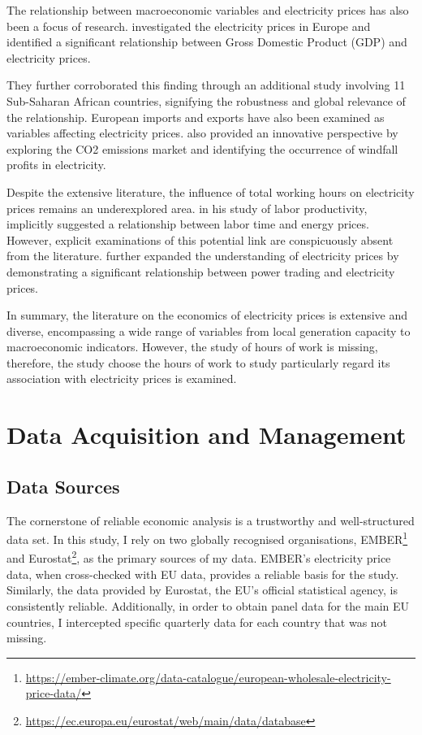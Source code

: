 \documentclass[12pt]{article}
\begin{document}
The relationship between macroeconomic variables and electricity prices has also been a focus of research. 
\cite{da2017assessing} investigated the electricity prices in Europe and identified a significant relationship between Gross Domestic Product (GDP) and electricity prices.

They further corroborated this finding through an additional study involving 11 Sub-Saharan African countries, signifying the robustness and global relevance of the relationship. European imports and exports have also been examined as variables affecting electricity prices. \cite{sijm2006co2} also provided an innovative perspective by exploring the CO2 emissions market and identifying the occurrence of windfall profits in electricity.

Despite the extensive literature, the influence of total working hours on electricity prices remains an underexplored area. \cite{mattey1995factor} in his study of labor productivity, implicitly suggested a relationship between labor time and energy prices. However, explicit examinations of this potential link are conspicuously absent from the literature. \cite{van2016electricity} further expanded the understanding of electricity prices by demonstrating a significant relationship between power trading and electricity prices.

In summary, the literature on the economics of electricity prices is extensive and diverse, encompassing a wide range of variables from local generation capacity to macroeconomic indicators. However, the study of hours of work is missing, therefore, the study choose the hours of work to study particularly regard its association with electricity prices is examined.

\section{Data Acquisition and Management}

\subsection{Data Sources}
The cornerstone of reliable economic analysis is a trustworthy and well-structured data set. In this study, I rely on two globally recognised organisations, EMBER\footnote{\url{https://ember-climate.org/data-catalogue/european-wholesale-electricity-price-data/}} and Eurostat\footnote{\url{https://ec.europa.eu/eurostat/web/main/data/database}}, as the primary sources of my data. EMBER's electricity price data, when cross-checked with EU data, provides a reliable basis for the study. Similarly, the data provided by Eurostat, the EU's official statistical agency, is consistently reliable. Additionally, in order to obtain panel data for the main EU countries, I intercepted specific quarterly data for each country that was not missing.
\end{document}
